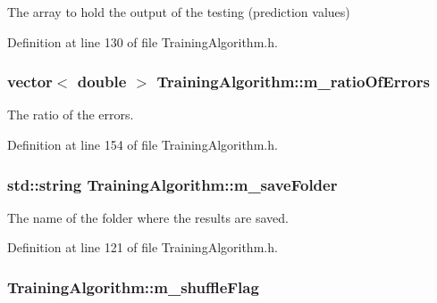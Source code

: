 The array to hold the output of the testing (prediction values) 



Definition at line 130 of file Training\+Algorithm.\+h.

\subsubsection[{\texorpdfstring{m\+\_\+ratio\+Of\+Errors}{m_ratioOfErrors}}]{\setlength{\rightskip}{0pt plus 5cm}vector$<$ double $>$ Training\+Algorithm\+::m\+\_\+ratio\+Of\+Errors\hspace{0.3cm}{\ttfamily [private]}}\hypertarget{classTrainingAlgorithm_aefb64ecb3d81de7dacab09cb5e1e2be3}{}\label{classTrainingAlgorithm_aefb64ecb3d81de7dacab09cb5e1e2be3}


The ratio of the errors. 



Definition at line 154 of file Training\+Algorithm.\+h.

\subsubsection[{\texorpdfstring{m\+\_\+save\+Folder}{m_saveFolder}}]{\setlength{\rightskip}{0pt plus 5cm}std\+::string Training\+Algorithm\+::m\+\_\+save\+Folder\hspace{0.3cm}{\ttfamily [private]}}\hypertarget{classTrainingAlgorithm_aeff62baa6799a9d12f24a74805b46eea}{}\label{classTrainingAlgorithm_aeff62baa6799a9d12f24a74805b46eea}


The name of the folder where the results are saved. 



Definition at line 121 of file Training\+Algorithm.\+h.

\subsubsection[{\texorpdfstring{m\+\_\+shuffle\+Flag}{m_shuffleFlag}}]{ Training\+Algorithm\+::m\+\_\+shuffle\+Flag\hspace{0.3cm}{\ttfamily [private]}}\hypertarget{classTrainingAlgorithm_a2c5345e01d68a30577105f0f82014585}{}\label{classTrainingAlgorithm_a2c5345e01d68a30577105f0f82014585}


